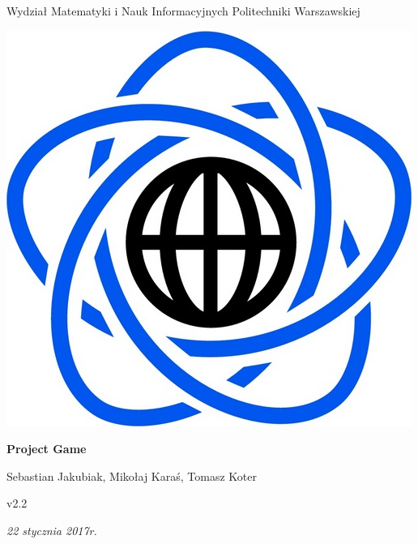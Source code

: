 \documentclass[11pt]{article}
\begin{document}
\begin{titlepage}
\centering

{\large Wydział Matematyki i Nauk Informacyjnych Politechniki Warszawskiej}

\vspace{1cm}
\includegraphics[scale=0.15]{../res/logo}
\vspace{3cm}

{\Huge\bfseries Project Game}

\vspace{1cm}

{\Large Sebastian Jakubiak, Mikołaj Karaś, Tomasz Koter}

\vspace{1cm}

{\large v2.2}

\vspace{1cm}

\vfill

{\itshape {\large 22 stycznia 2017r.}}
\end{titlepage}

\tableofcontents
\end{document}
